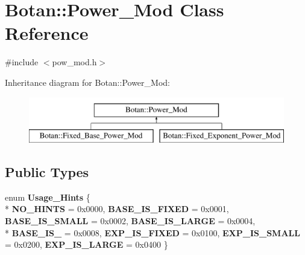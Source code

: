 \hypertarget{classBotan_1_1Power__Mod}{\section{Botan\-:\-:Power\-\_\-\-Mod Class Reference}
\label{classBotan_1_1Power__Mod}
}


{\ttfamily \#include $<$pow\-\_\-mod.\-h$>$}

Inheritance diagram for Botan\-:\-:Power\-\_\-\-Mod\-:\begin{figure}[H]
\begin{center}
\leavevmode
\includegraphics[height=2.000000cm]{classBotan_1_1Power__Mod}
\end{center}
\end{figure}
\subsection*{Public Types}
\begin{DoxyCompactItemize}
\item 
enum {\bfseries Usage\-\_\-\-Hints} \{ \\*
{\bfseries N\-O\-\_\-\-H\-I\-N\-T\-S} = 0x0000, 
{\bfseries B\-A\-S\-E\-\_\-\-I\-S\-\_\-\-F\-I\-X\-E\-D} = 0x0001, 
{\bfseries B\-A\-S\-E\-\_\-\-I\-S\-\_\-\-S\-M\-A\-L\-L} = 0x0002, 
{\bfseries B\-A\-S\-E\-\_\-\-I\-S\-\_\-\-L\-A\-R\-G\-E} = 0x0004, 
\\*
{\bfseries B\-A\-S\-E\-\_\-\-I\-S\-\_} = 0x0008, 
{\bfseries E\-X\-P\-\_\-\-I\-S\-\_\-\-F\-I\-X\-E\-D} = 0x0100, 
{\bfseries E\-X\-P\-\_\-\-I\-S\-\_\-\-S\-M\-A\-L\-L} = 0x0200, 
{\bfseries E\-X\-P\-\_\-\-I\-S\-\_\-\-L\-A\-R\-G\-E} = 0x0400
 \}
\end{DoxyCompactItemize}
